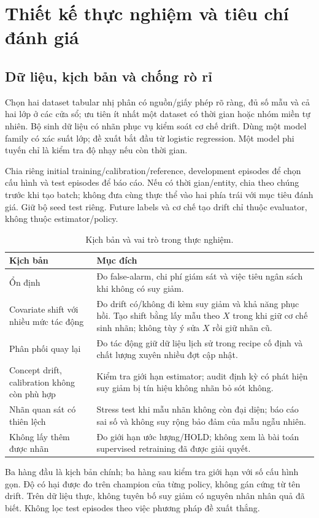 \section{Thiết kế thực nghiệm và tiêu chí đánh giá}
\subsection{Dữ liệu, kịch bản và chống rò rỉ}
Chọn hai dataset tabular nhị phân có nguồn/giấy phép rõ ràng, đủ số mẫu và cả hai lớp ở các cửa sổ; ưu tiên ít nhất một dataset có thời gian hoặc nhóm miền tự nhiên. Bộ sinh dữ liệu có nhãn phục vụ kiểm soát cơ chế drift. Dùng một model family có xác suất lớp; đề xuất bắt đầu từ logistic regression. Một model phi tuyến chỉ là kiểm tra độ nhạy nếu còn thời gian.

Chia riêng initial training/calibration/reference, development episodes để chọn cấu hình và test episodes để báo cáo. Nếu có thời gian/entity, chia theo chúng trước khi tạo batch; không đưa cùng thực thể vào hai phía trái với mục tiêu đánh giá. Giữ bộ seed test riêng. Future labels và cơ chế tạo drift chỉ thuộc evaluator, không thuộc estimator/policy.

\begin{table}[ht]
\centering
\caption{Kịch bản và vai trò trong thực nghiệm.}\label{tab:scenarios}
\begin{tabularx}{\linewidth}{@{}L{3.8cm} Y@{}}
\toprule\textbf{Kịch bản} & \textbf{Mục đích} \\
\midrule
Ổn định & Đo false-alarm, chi phí giám sát và việc tiêu ngân sách khi không có suy giảm. \\
Covariate shift với nhiều mức tác động & Đo drift có/không đi kèm suy giảm và khả năng phục hồi. Tạo shift bằng lấy mẫu theo $X$ trong khi giữ cơ chế sinh nhãn; không tùy ý sửa $X$ rồi giữ nhãn cũ. \\
Phân phối quay lại & Đo tác động giữ dữ liệu lịch sử trong recipe cố định và chất lượng xuyên nhiều đợt cập nhật. \\
Concept drift, calibration không còn phù hợp & Kiểm tra giới hạn estimator; audit định kỳ có phát hiện suy giảm bị tín hiệu không nhãn bỏ sót không. \\
Nhãn quan sát có thiên lệch & Stress test khi mẫu nhãn không còn đại diện; báo cáo sai số và không suy rộng bảo đảm của mẫu ngẫu nhiên. \\
Không lấy thêm được nhãn & Đo giới hạn ước lượng/HOLD; không xem là bài toán supervised retraining đã được giải quyết. \\
\bottomrule
\end{tabularx}
\end{table}
Ba hàng đầu là kịch bản chính; ba hàng sau kiểm tra giới hạn với số cấu hình gọn. Độ có hại được đo trên champion của từng policy, không gán cứng từ tên drift. Trên dữ liệu thực, không tuyên bố suy giảm có nguyên nhân nhân quả đã biết. Không lọc test episodes theo việc phương pháp đề xuất thắng.

